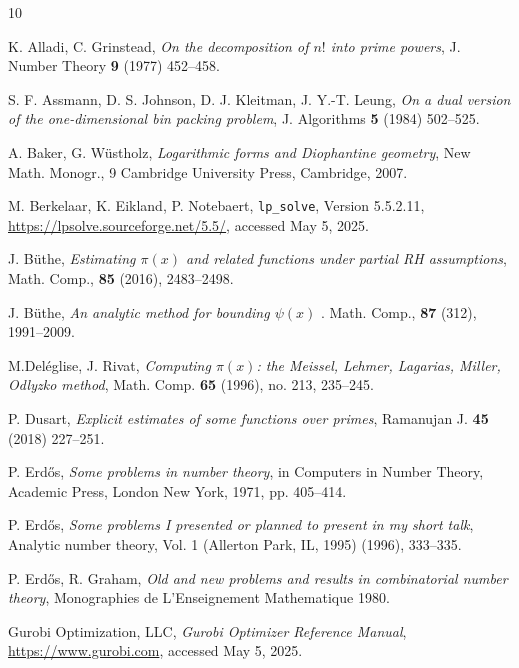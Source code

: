 \documentclass[10pt,a4paper,reqno]{amsart}
\numberwithin{equation}{section}
\theoremstyle{plain}
\theoremstyle{definition}
\begin{document}
\begin{thebibliography}{10}


K. Alladi, C. Grinstead, \emph{On the decomposition of $n!$ into prime powers}, J. Number Theory \textbf{9} (1977) 452--458.

S. F. Assmann, D. S. Johnson, D. J. Kleitman, J. Y.-T. Leung, \emph{On a dual version of the one-dimensional bin packing problem}, J. Algorithms \textbf{5} (1984) 502--525.

A. Baker, G. W\"ustholz, \emph{Logarithmic forms and Diophantine geometry}, New Math. Monogr., 9 Cambridge University Press, Cambridge, 2007.

M. Berkelaar, K. Eikland, P. Notebaert, \texttt{lp\_solve}, Version 5.5.2.11, \url{https://lpsolve.sourceforge.net/5.5/}, accessed May 5, 2025.

J. B\"uthe, \emph{Estimating $\pi(x)$ and related functions under partial RH assumptions}, Math. Comp., \textbf{85} (2016), 2483--2498.

J. B\"uthe, \emph{An analytic method for bounding $\psi(x)$
}. Math. Comp., \textbf{87} (312), 1991--2009.



M.Del\'eglise, J. Rivat, \emph{Computing $\pi(x)$: the Meissel, Lehmer, Lagarias, Miller, Odlyzko method}, Math. Comp. \textbf{65} (1996), no. 213, 235--245.

P. Dusart, \emph{Explicit estimates of some functions over primes}, Ramanujan J. \textbf{45} (2018) 227--251.

P. Erd\H{o}s, \emph{Some problems in number theory}, in Computers in Number Theory, Academic Press, London New York, 1971, pp. 405--414.

P. Erd\H{o}s, \emph{Some problems I presented or planned to present in my short talk}, Analytic number theory, Vol. 1 (Allerton Park, IL, 1995) (1996), 333--335.

P. Erd\H{o}s, R. Graham, \emph{Old and new problems and results in combinatorial number theory}, Monographies de L'Enseignement Mathematique 1980.

Gurobi Optimization, LLC, \emph{Gurobi Optimizer Reference Manual}, \url{https://www.gurobi.com}, accessed May 5, 2025.


\end{thebibliography}
\end{document}
